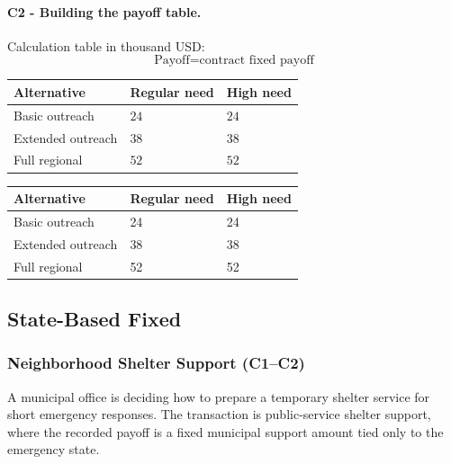 
	\paragraph*{C2 - Building the payoff table.}
	\label{subsec:problem11-mobile-clinic-service-contracts-c2}
	Calculation table in thousand USD:
	\[
	\text{Payoff}=\text{contract fixed payoff}
	\]
	\begin{center}
		\begin{tabular}{lll}
			\toprule
			Alternative & Regular need & High need \\
			\midrule
			Basic outreach & $24$ & $24$ \\
			Extended outreach & $38$ & $38$ \\
			Full regional & $52$ & $52$ \\
			\bottomrule
		\end{tabular}
	\end{center}

	\begin{center}
		\begin{tabular}{lll}
			\toprule
			Alternative & Regular need & High need \\
			\midrule
			Basic outreach & 24 & 24 \\
			Extended outreach & 38 & 38 \\
			Full regional & 52 & 52 \\
			\bottomrule
		\end{tabular}
	\end{center}


	\subsection{State-Based Fixed}
	\label{sec:state-based-fixed-payoff-only}


	\subsubsection{Neighborhood Shelter Support (C1--C2)}
	\label{sec:problem12-neighborhood-shelter-support-c1-c2}
	A municipal office is deciding how to prepare a temporary shelter service for short emergency responses. The transaction is public-service shelter support, where the recorded payoff is a fixed municipal support amount tied only to the emergency state.

